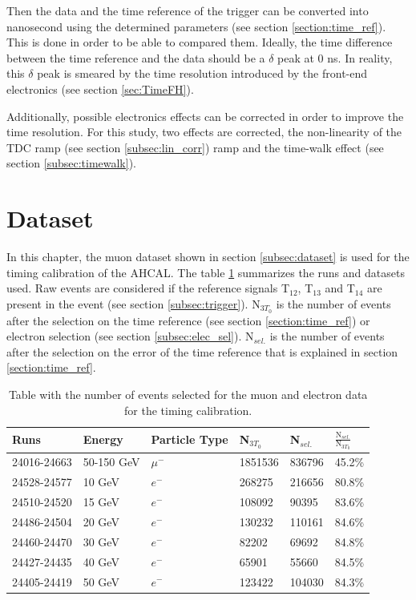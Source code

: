 Then the data and the time reference of the trigger can be converted into nanosecond using the determined parameters (see section \ref{section:time_ref}). This is done in order to be able to compared them. Ideally, the time difference between the time reference and the data should be a $\delta$ peak at 0 ns. In reality, this $\delta$ peak is smeared by the time resolution introduced by the front-end electronics (see section \ref{sec:TimeFH}).

Additionally, possible electronics effects can be corrected in order to improve the time resolution. For this study, two effects are corrected, the non-linearity of the TDC ramp (see section \ref{subsec:lin_corr}) ramp and the time-walk effect (see section \ref{subsec:timewalk}).

\section{Dataset}

In this chapter, the muon dataset shown in section \ref{subsec:dataset} is used for the timing calibration of the AHCAL. The table \ref{table:mu_elec_runs} summarizes the runs and datasets used. Raw events are considered if the reference signals T$_{12}$, T$_{13}$ and T$_{14}$ are present in the event (see section \ref{subsec:trigger}). N$_{3 T_0}$ is the number of events after the selection on the time reference (see section \ref{section:time_ref}) or electron selection (see section \ref{subsec:elec_sel}). N$_{sel.}$ is the number of events after the selection on the error of the time reference that is explained in section \ref{section:time_ref}.

\begin{table}[htb!]
	\centering
	\caption{Table with the number of events selected for the muon and electron data for the timing calibration.}
	\label{table:mu_elec_runs}
	\begin{tabular}{@{} llllll @{}}
		\toprule
		Runs & Energy & Particle Type & N$_{3 T_0}$ & N$_{sel.}$ & $\frac{\text{N$_{sel.}$}}{\text{N$_{3 T_0}$}}$ \\
		\midrule
		24016-24663 & 50-150 GeV & $\mu^-$ & 1851536 & 836796 & 45.2\% \\
		\midrule
		24528-24577 & 10 GeV & $e^-$ & 268275 & 216656 & 80.8\% \\
		24510-24520 & 15 GeV & $e^-$ & 108092 & 90395 & 83.6\% \\
		24486-24504 & 20 GeV & $e^-$ & 130232 & 110161 & 84.6\% \\
		24460-24470 & 30 GeV & $e^-$ & 82202 & 69692 & 84.8\% \\
		24427-24435 & 40 GeV & $e^-$ & 65901 & 55660 & 84.5\% \\
		24405-24419 & 50 GeV & $e^-$ & 123422 & 104030 & 84.3\% \\
		\bottomrule
	\end{tabular}
\end{table}

